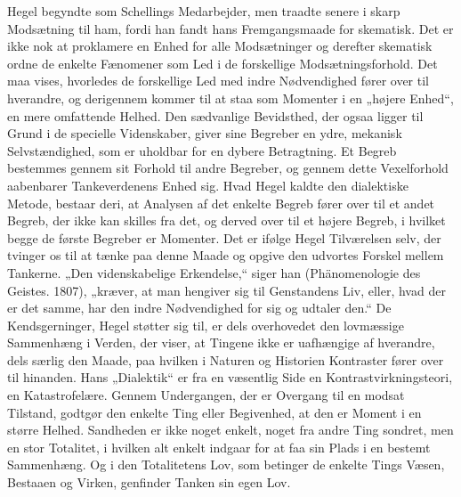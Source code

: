 \documentclass[12pt,a4paper,openany]{book}
\newcommand{\opage}[1]{\marginnote{\footnotesize\textit{[#1]}}}
\begin{document}
\opage{10}Hegel begyndte som Schellings Medarbejder, men traadte senere
i skarp Modsætning til ham, fordi han fandt hans Fremgangsmaade
for skematisk. Det er ikke nok at proklamere en Enhed for alle Modsætninger
og derefter skematisk ordne de enkelte Fænomener som
Led i de forskellige Modsætningsforhold. Det maa vises, hvorledes
de forskellige Led med indre Nødvendighed fører over til hverandre,
og derigennem kommer til at staa som Momenter i en „højere Enhed“,
en mere omfattende Helhed. Den sædvanlige Bevidsthed, der
ogsaa ligger til Grund i de specielle Videnskaber, giver sine Begreber
en ydre, mekanisk Selvstændighed, som er uholdbar for en dybere
Betragtning. Et Begreb bestemmes gennem sit Forhold til andre Begreber,
og gennem dette Vexelforhold aabenbarer Tankeverdenens
Enhed sig. Hvad Hegel kaldte den dialektiske Metode, bestaar deri,
at Analysen af det enkelte Begreb fører over til et andet Begreb,
der ikke kan skilles fra det, og derved over til et højere Begreb, i
hvilket begge de første Begreber er Momenter. Det er ifølge Hegel Tilværelsen
selv, der tvinger os til at tænke paa denne Maade og opgive
den udvortes Forskel mellem Tankerne. „Den videnskabelige Erkendelse,“
siger han (Phänomenologie des Geistes. 1807), „kræver, at
man hengiver sig til Genstandens Liv, eller, hvad der er det samme,
har den indre Nødvendighed for sig og udtaler den.“ De Kendsgerninger,
Hegel støtter sig til, er dels overhovedet den lovmæssige Sammenhæng
i Verden, der viser, at Tingene ikke er uafhængige af hverandre,
dels særlig den Maade, paa hvilken i Naturen og Historien
Kontraster fører over til hinanden. Hans „Dialektik“ er fra en væsentlig
Side en Kontrastvirkningsteori, en Katastrofelære. Gennem
Undergangen, der er Overgang til en modsat Tilstand, godtgør den
enkelte Ting eller Begivenhed, at den er Moment i en større Helhed.
Sandheden er ikke noget enkelt, noget fra andre Ting sondret, men
en stor Totalitet, i hvilken alt enkelt indgaar for at faa sin Plads i
en bestemt Sammenhæng. Og i den Totalitetens Lov, som betinger
de enkelte Tings Væsen, Bestaaen og Virken, genfinder Tanken sin
egen Lov.
\end{document}
